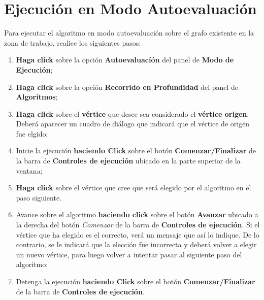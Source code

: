 \documentclass{book}
\begin{document}
\section{Ejecución en Modo Autoevaluación}

Para ejecutar el algoritmo en modo autoevaluación sobre el grafo existente en la zona de trabajo, realice los siguientes pasos:
\medskip

\begin{enumerate}
	\itemsep=8pt \topsep=0pt \partopsep=0pt \parskip=0pt \parsep=0pt

	\item \textbf{Haga click} sobre la opción \textbf{Autoevaluacíón} del panel de \textbf{Modo de Ejecución};

	\item \textbf{Haga click} sobre la opción \textbf{Recorrido en Profundidad} del panel de \textbf{Algoritmos};

	\item \textbf{Haga click} sobre el \textbf{vértice} que desee sea considerado el \textbf{vértice origen}. Deberá aparecer un cuadro de diálogo que indicará que el vértice de origen fue elgido;

	\item Inicie la ejecución \textbf{haciendo Click} sobre el botón \textbf{Comenzar/Finalizar} de la barra de \textbf{Controles de ejecución} ubicado en la parte superior de la ventana;

	\item \textbf{Haga click} sobre el vértice que cree que será elegido por el algoritmo en el paso siguiente.

	\item Avance sobre el algoritmo \textbf{haciendo click} sobre el botón \textbf{Avanzar} ubicado a la derecha del botón \textit{Comenzar} de la barra de \textbf{Controles de ejecución}. Si el vértice que ha elegido es el correcto, verá un mensaje que así lo indique. De lo contrario, se le indicará que la elección fue incorrecta y deberá volver a elegir un nuevo vértice, para luego volver a intentar pasar al siguiente paso del algoritmo;

	\item Detenga la ejecución \textbf{haciendo Click} sobre el botón \textbf{Comenzar/Finalizar} de la barra de \textbf{Controles de ejecución}.

\end{enumerate}
\medskip
\end{document}
